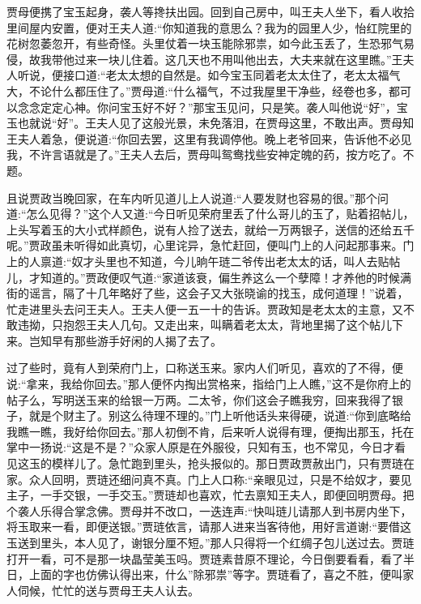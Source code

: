 \begin{parag}
    贾母便携了宝玉起身，袭人等搀扶出园。回到自己房中，叫王夫人坐下，看人收拾里间屋内安置，便对王夫人道:“你知道我的意思么？我为的园里人少，怡红院里的花树忽萎忽开，有些奇怪。头里仗着一块玉能除邪祟，如今此玉丢了，生恐邪气易侵，故我带他过来一块儿住着。这几天也不用叫他出去，大夫来就在这里瞧。”王夫人听说，便接口道:“老太太想的自然是。如今宝玉同着老太太住了，老太太福气大，不论什么都压住了。”贾母道:“什么福气，不过我屋里干净些，经卷也多，都可以念念定定心神。你问宝玉好不好？”那宝玉见问，只是笑。袭人叫他说“好”，宝玉也就说“好”。王夫人见了这般光景，未免落泪，在贾母这里，不敢出声。贾母知王夫人着急，便说道:“你回去罢，这里有我调停他。晚上老爷回来，告诉他不必见我，不许言语就是了。”王夫人去后，贾母叫鸳鸯找些安神定魄的药，按方吃了。不题。
\end{parag}


\begin{parag}
    且说贾政当晚回家，在车内听见道儿上人说道:“人要发财也容易的很。”那个问道:“怎么见得？”这个人又道:“今日听见荣府里丢了什么哥儿的玉了，贴着招帖儿，上头写着玉的大小式样颜色，说有人捡了送去，就给一万两银子，送信的还给五千呢。”贾政虽未听得如此真切，心里诧异，急忙赶回，便叫门上的人问起那事来。门上的人禀道:“奴才头里也不知道，今儿晌午琏二爷传出老太太的话，叫人去贴帖儿，才知道的。”贾政便叹气道:“家道该衰，偏生养这么一个孽障！才养他的时候满街的谣言，隔了十几年略好了些，这会子又大张晓谕的找玉，成何道理！”说着，忙走进里头去问王夫人。王夫人便一五一十的告诉。贾政知是老太太的主意，又不敢违拗，只抱怨王夫人几句。又走出来，叫瞒着老太太，背地里揭了这个帖儿下来。岂知早有那些游手好闲的人揭了去了。
\end{parag}


\begin{parag}
    过了些时，竟有人到荣府门上，口称送玉来。家内人们听见，喜欢的了不得，便说:“拿来，我给你回去。”那人便怀内掏出赏格来，指给门上人瞧，”这不是你府上的帖子么，写明送玉来的给银一万两。二太爷，你们这会子瞧我穷，回来我得了银子，就是个财主了。别这么待理不理的。”门上听他话头来得硬，说道:“你到底略给我瞧一瞧，我好给你回去。”那人初倒不肯，后来听人说得有理，便掏出那玉，托在掌中一扬说:“这是不是？”众家人原是在外服役，只知有玉，也不常见，今日才看见这玉的模样儿了。急忙跑到里头，抢头报似的。那日贾政贾赦出门，只有贾琏在家。众人回明，贾琏还细问真不真。门上人口称:“亲眼见过，只是不给奴才，要见主子，一手交银，一手交玉。”贾琏却也喜欢，忙去禀知王夫人，即便回明贾母。把个袭人乐得合掌念佛。贾母并不改口，一迭连声:“快叫琏儿请那人到书房内坐下，将玉取来一看，即便送银。”贾琏依言，请那人进来当客待他，用好言道谢:“要借这玉送到里头，本人见了，谢银分厘不短。”那人只得将一个红绸子包儿送过去。贾琏打开一看，可不是那一块晶莹美玉吗。贾琏素昔原不理论，今日倒要看看，看了半日，上面的字也仿佛认得出来，什么”除邪祟”等字。贾琏看了，喜之不胜，便叫家人伺候，忙忙的送与贾母王夫人认去。
\end{parag}


